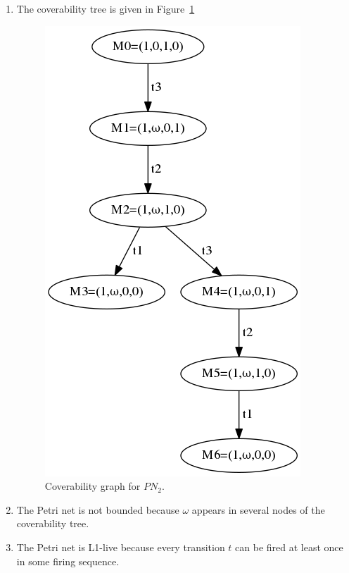 \documentclass{bsu-ms}
\begin{document}
\begin{enumerate}
\begin{enumerate}[label=(\alph*)]
		\item The coverability tree is given in
		Figure~\ref{fig:pn2cov}
		\begin{figure}[ht]
			\begin{center}
				\includegraphics[scale=.6,keepaspectratio]{pn2cov}
			\end{center}
			\caption{Coverability graph for $PN_2$.}
			\label{fig:pn2cov}
		\end{figure}
		
		\item The Petri net is not bounded because $\omega$
		appears in several nodes of the coverability tree.
		
		\item The Petri net is L1-live because every transition $t$
		can be fired at least once in some firing sequence.
	\end{enumerate}
\end{enumerate}
\end{document}
